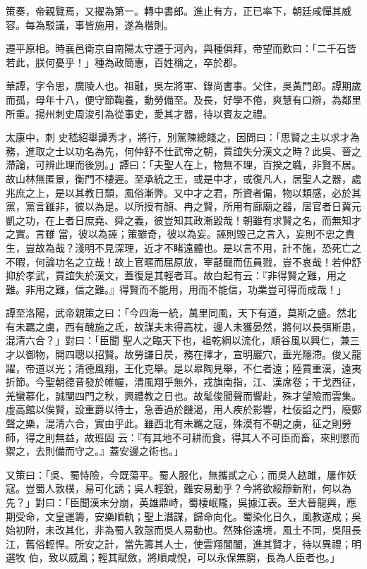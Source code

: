 \begin{pinyinscope}
 策奏，帝親覽焉，又擢為第一。轉中書郎。進止有方，正已率下，朝廷咸憚其威容。每為駁議，事皆施用，遂為楷則。



 遷平原相。時襄邑衛京自南陽太守遷于河內，與種俱拜，帝望而歎曰：「二千石皆若此，朕何憂乎！」種為政簡惠，百姓稱之，卒於郡。



 華譚，字令思，廣陵人也。祖融，吳左將軍、錄尚書事。父住，吳黃門郎。譚期歲而孤，母年十八，便守節鞠養，動勞備至。及長，好學不倦，爽慧有口辯，為鄰里所重。揚州刺史周浚引為從事史，愛其才器，待以賓友之禮。



 太康中，刺
 史嵇紹舉譚秀才，將行，別駕陳總餞之，因問曰：「思賢之主以求才為務，進取之士以功名為先，何仲舒不仕武帝之朝，賈誼失分漢文之時？此吳、晉之滯論，可辨此理而後別。」譚曰：「夫聖人在上，物無不理，百揆之職，非賢不居。故山林無匿景，衡門不棲遲。至承統之王，或是中才，或復凡人，居聖人之器，處兆庶之上，是以其教日頹，風俗漸弊。又中才之君，所資者偏，物以類感，必於其黨，黨言雖非，彼以為是。以所授有顏、冉之賢，所用有廊廟之器，居官者日冀元凱之功，在上者日庶堯、舜之義，彼豈知其政漸毀哉！朝雖有求賢之名，而無知才之實。言雖
 當，彼以為誣；策雖奇，彼以為妄。誣則毀己之言入，妄則不忠之責生，豈故為哉？淺明不見深理，近才不睹遠體也。是以言不用，計不施，恐死亡之不暇，何論功名之立哉！故上官暱而屈原放，宰嚭寵而伍員戮，豈不哀哉！若仲舒抑於孝武，賈誼失於漢文，蓋復是其輕者耳。故白起有云：『非得賢之難，用之難。非用之難，信之難。』得賢而不能用，用而不能信，功業豈可得而成哉！」



 譚至洛陽，武帝親策之曰：「今四海一統，萬里同風，天下有道，莫斯之盛。然北有未羈之虜，西有醜施之氐，故謀夫未得高枕，邊人未獲晏然，將何以長弭斯患，混清六合？」對曰：「臣聞
 聖人之臨天下也，祖乾綱以流化，順谷風以興仁，兼三才以御物，開四聰以招賢。故勞謙日昃，務在擇才，宣明巖穴，垂光隱滯。俊乂龍躍，帝道以光；清德風翔，王化克舉。是以皋陶見舉，不仁者遠；陸賈重漢，遠夷折節。今聖朝德音發於帷幄，清風翔乎無外，戎旗南指，江、漢席卷；干戈西征，羌蠻慕化，誠闡四門之秋，興禮教之日也。故髦俊聞聲而響赴，殊才望險而雲集。虛高館以俟賢，設重爵以待士，急善過於饑渴，用人疾於影響，杜佞諂之門，廢鄭聲之樂，混清六合，實由乎此。雖西北有未羈之寇，殊漠有不朝之虜，征之則勞師，得之則無益，故班固
 云：『有其地不可耕而食，得其人不可臣而畜，來則懲而禦之，去則備而守之。』蓋安邊之術也。」



 又策曰：「吳、蜀恃險，今既蕩平。蜀人服化，無攜貳之心；而吳人趑雎，屢作妖寇。豈蜀人敦樸，易可化誘；吳人輕銳，難安易動乎？今將欲綏靜新附，何以為先？」對曰：「臣聞漢末分崩，英雄鼎峙，蜀棲岷隴，吳據江表。至大晉龍興，應期受命，文皇運籌，安樂順軌；聖上潛謀，歸命向化。蜀染化日久，風教遂成；吳始初附，未改其化，非為蜀人敦愨而吳人易動也。然殊俗遠境，風土不同，吳阻長江，舊俗輕悍。所安之計，當先籌其人士，使雲翔閶闔，進其賢才，待以異禮；明選牧
 伯，致以威風；輕其賦斂，將順咸悅，可以永保無窮，長為人臣者也。」




\end{pinyinscope}
